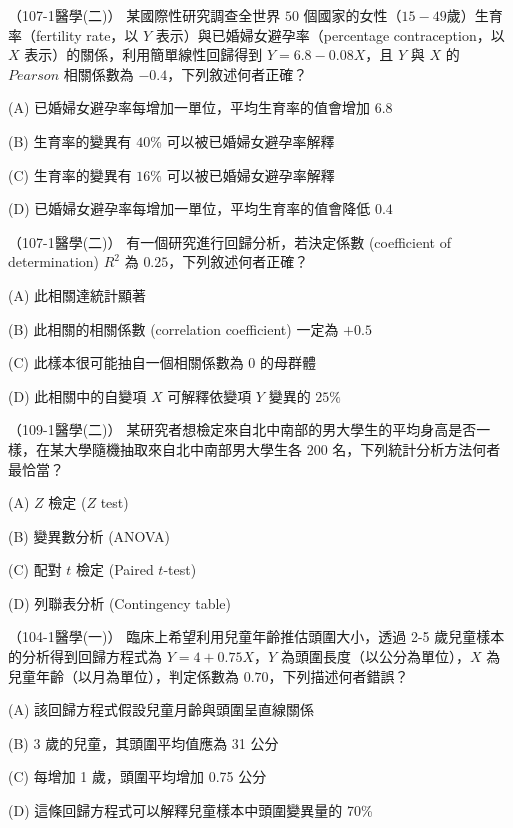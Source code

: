     \begin{docexam}{（107-1醫學(二)）}
        某國際性研究調查全世界 $50$ 個國家的女性（$15-49$歲）生育率（fertility rate，以 $Y$ 表示）與已婚婦女避孕率（percentage contraception，以 $X$ 表示）的關係，利用簡單線性回歸得到 $Y = 6.8-0.08 X$，且 $Y$ 與 $X$ 的 $Pearson$ 相關係數為 $-0.4$，下列敘述何者正確？

        (A) 已婚婦女避孕率每增加一單位，平均生育率的值會增加 $6.8$
        
        (B) 生育率的變異有 $40\%$ 可以被已婚婦女避孕率解釋

        (C) 生育率的變異有 $16\%$ 可以被已婚婦女避孕率解釋
 
        (D) 已婚婦女避孕率每增加一單位，平均生育率的值會降低 $0.4$
    \end{docexam}
    
    \begin{docexam}{（107-1醫學(二)）}
        有一個研究進行回歸分析，若決定係數 (coefficient of determination) $R^2$ 為 $0.25$，下列敘述何者正確？

        (A) 此相關達統計顯著
        
        (B) 此相關的相關係數 (correlation coefficient) 一定為 $+0.5$

        (C) 此樣本很可能抽自一個相關係數為 $0$ 的母群體
 
        (D) 此相關中的自變項 $X$ 可解釋依變項 $Y$ 變異的 $25\%$
    \end{docexam}
    
    \begin{docexam}{（109-1醫學(二)）}
        某研究者想檢定來自北中南部的男大學生的平均身高是否一樣，在某大學隨機抽取來自北中南部男大學生各 $200$ 名，下列統計分析方法何者最恰當？

        (A) $Z$ 檢定 ($Z$ test)
        
        (B) 變異數分析 (ANOVA)

        (C) 配對 $t$ 檢定 (Paired $t$-test)
 
        (D) 列聯表分析 (Contingency table)
    \end{docexam}
    
    \begin{docexam}{（104-1醫學(一)）}
        臨床上希望利用兒童年齡推估頭圍大小，透過 2-5 歲兒童樣本的分析得到回歸方程式為 $Y = 4 + 0.75X$，$Y$ 為頭圍長度（以公分為單位），$X$ 為兒童年齡（以月為單位），判定係數為 $0.70$，下列描述何者錯誤？

        (A) 該回歸方程式假設兒童月齡與頭圍呈直線關係
        
        (B) 3 歲的兒童，其頭圍平均值應為 31 公分

        (C) 每增加 1 歲，頭圍平均增加 0.75 公分
 
        (D) 這條回歸方程式可以解釋兒童樣本中頭圍變異量的 70\%
    \end{docexam}
